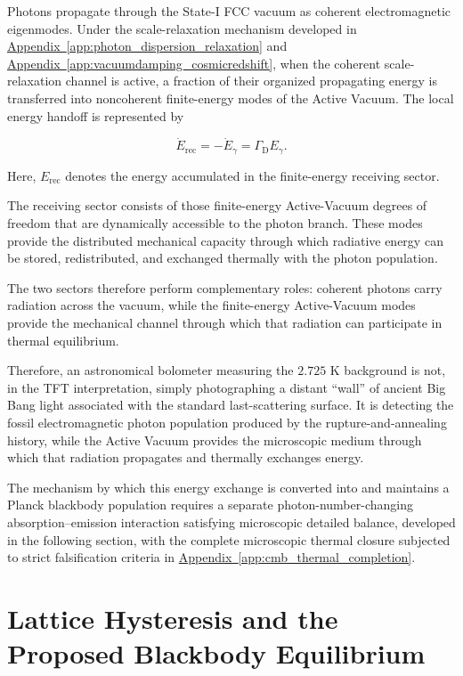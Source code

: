 Photons propagate through the State-I FCC vacuum as coherent electromagnetic eigenmodes. Under the scale-relaxation mechanism developed in \hyperref[app:photon_dispersion_relaxation]{Appendix~\ref*{app:photon_dispersion_relaxation}} and \hyperref[app:vacuumdamping_cosmicredshift]{Appendix~\ref*{app:vacuumdamping_cosmicredshift}}, when the coherent scale-relaxation channel is active, a fraction of their organized propagating energy is transferred into noncoherent finite-energy modes of the Active Vacuum. The local energy handoff is represented by

\begin{equation}
    \dot E_{\mathrm{rec}}
    =
    -\dot E_{\gamma}
    =
    \Gamma_{\mathrm D}E_{\gamma}.
\end{equation}

Here, $E_{\mathrm{rec}}$ denotes the energy accumulated in the finite-energy receiving sector.

The receiving sector consists of those finite-energy Active-Vacuum degrees of freedom that are dynamically accessible to the photon branch. These modes provide the distributed mechanical capacity through which radiative energy can be stored, redistributed, and exchanged thermally with the photon population.

The two sectors therefore perform complementary roles: coherent photons carry radiation across the vacuum, while the finite-energy Active-Vacuum modes provide the mechanical channel through which that radiation can participate in thermal equilibrium.

Therefore, an astronomical bolometer measuring the \(2.725\) K background is not, in the TFT interpretation, simply photographing a distant ``wall'' of ancient Big Bang light associated with the standard last-scattering surface. It is detecting the fossil electromagnetic photon population produced by the rupture-and-annealing history, while the Active Vacuum provides the microscopic medium through which that radiation propagates and thermally exchanges energy.

The mechanism by which this energy exchange is converted into and maintains a Planck blackbody population requires a separate photon-number-changing absorption--emission interaction satisfying microscopic detailed balance, developed in the following section, with the complete microscopic thermal closure subjected to strict falsification criteria in \hyperref[app:cmb_thermal_completion]{Appendix~\ref*{app:cmb_thermal_completion}}.

\section{Lattice Hysteresis and the Proposed Blackbody Equilibrium}

